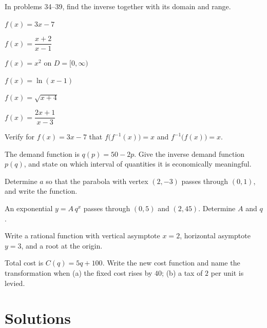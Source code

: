 In problems 34--39, find the inverse together with its domain and range.

\begin{problems}[resume]
  \item $f(x)=3x-7$
  \item $f(x)=\dfrac{x+2}{x-1}$
  \item $f(x)=x^{2}$ on $D=[0,\infty)$
  \item $f(x)=\ln(x-1)$
  \item $f(x)=\sqrt{x+4}$
  \item $f(x)=\dfrac{2x+1}{x-3}$
  \item Verify for $f(x)=3x-7$ that $f\bigl(f^{-1}(x)\bigr)=x$ and
        $f^{-1}\bigl(f(x)\bigr)=x$.
  \item The demand function is $q(p)=50-2p$. Give the inverse demand
        function $p(q)$, and state on which interval of quantities it is
        economically meaningful.
\end{problems}

\begin{problems}[resume]
  \item Determine $a$ so that the parabola with vertex $(2,-3)$ passes
        through $(0,1)$, and write the function.
  \item An exponential $y=A\,q^{x}$ passes through $(0,5)$ and $(2,45)$.
        Determine $A$ and $q$.
  \item Write a rational function with vertical asymptote $x=2$,
        horizontal asymptote $y=3$, and a root at the origin.
  \item Total cost is $C(q)=5q+100$. Write the new cost function and name
        the transformation when (a) the fixed cost rises by $40$;
        (b) a tax of $2$ per unit is levied.
\end{problems}

\section{Solutions}

